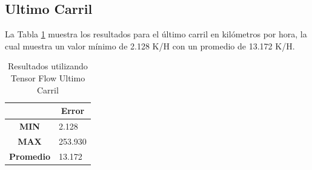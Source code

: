\subsection{Ultimo Carril}

La Tabla \ref{tab:resultadosTFCUltimo} muestra los resultados para el último carril en kilómetros por hora, la cual muestra un valor mínimo de 2.128 K/H con un promedio de 13.172 K/H.


\begin{table}[H]
    \centering
    \caption{Resultados utilizando Tensor Flow Ultimo Carril}
    \label{tab:resultadosTFCUltimo}
    \begin{tabular}{|c|l|}\hline

    & \multicolumn{1}{c|}{\textbf{Error}} \\ \hline
    \textbf{MIN} & 2.128 \\ \hline
    \textbf{MAX} & 253.930 \\ \hline
    \textbf{Promedio} & 13.172 \\ \hline
    \end{tabular}
\end{table}
